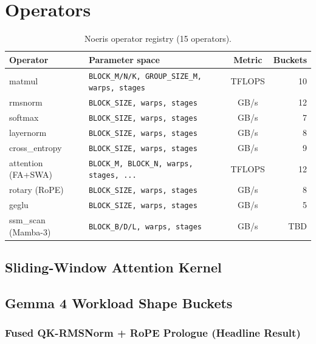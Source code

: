 \documentclass{article}
\begin{document}
\section{Operators}
\label{sec:operators}

\begin{table}[t]
\centering
\caption{Noeris operator registry (15 operators).}
\label{tab:operators}
\small
\begin{tabular}{@{}llcr@{}}
\toprule
Operator & Parameter space & Metric & Buckets \\
\midrule
matmul & \texttt{BLOCK\_M/N/K, GROUP\_SIZE\_M, warps, stages} & TFLOPS & 10 \\
rmsnorm & \texttt{BLOCK\_SIZE, warps, stages} & GB/s & 12 \\
softmax & \texttt{BLOCK\_SIZE, warps, stages} & GB/s & 7 \\
layernorm & \texttt{BLOCK\_SIZE, warps, stages} & GB/s & 8 \\
cross\_entropy & \texttt{BLOCK\_SIZE, warps, stages} & GB/s & 9 \\
attention (FA+SWA) & \texttt{BLOCK\_M, BLOCK\_N, warps, stages, ...} & TFLOPS & 12 \\
rotary (RoPE) & \texttt{BLOCK\_SIZE, warps, stages} & GB/s & 8 \\
geglu & \texttt{BLOCK\_SIZE, warps, stages} & GB/s & 5 \\
ssm\_scan (Mamba-3) & \texttt{BLOCK\_B/D/L, warps, stages} & GB/s & TBD \\
\bottomrule
\end{tabular}
\end{table}

\subsection{Sliding-Window Attention Kernel}
\label{sec:swa-kernel}

\subsection{Gemma 4 Workload Shape Buckets}
\label{sec:gemma4-shapes}

\subsubsection{Fused QK-RMSNorm + RoPE Prologue (Headline Result)}
\label{sec:fused-prologue}
\end{document}
